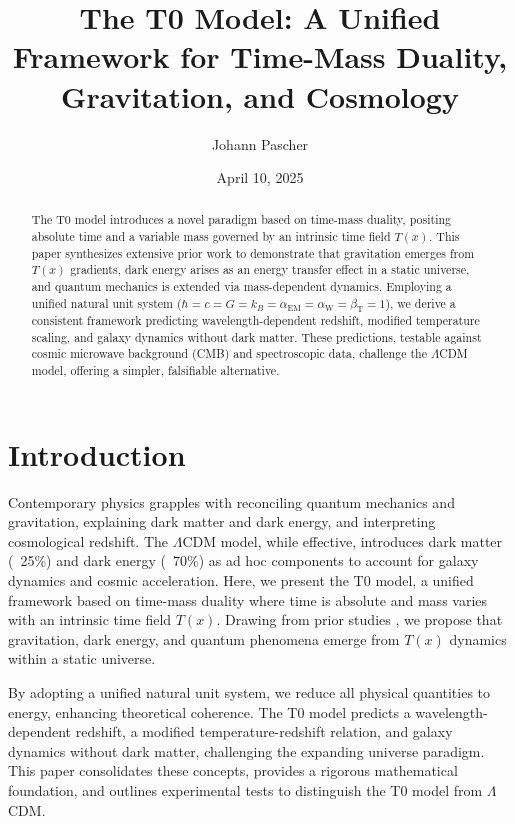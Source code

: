 \documentclass[12pt,a4paper]{article}
\title{The T0 Model: A Unified Framework for Time-Mass Duality, Gravitation, and Cosmology}
\author{Johann Pascher}
\date{April 10, 2025}
\newcommand{\Tfield}{T(x)}
\begin{document}
	
	\maketitle
	
	\begin{abstract}
		The T0 model introduces a novel paradigm based on time-mass duality, positing absolute time and a variable mass governed by an intrinsic time field \(\Tfield\). This paper synthesizes extensive prior work to demonstrate that gravitation emerges from \(\Tfield\) gradients, dark energy arises as an energy transfer effect in a static universe, and quantum mechanics is extended via mass-dependent dynamics. Employing a unified natural unit system (\(\hbar = c = G = k_B = \alpha_{\text{EM}} = \alpha_{\text{W}} = \beta_{\text{T}} = 1\)), we derive a consistent framework predicting wavelength-dependent redshift, modified temperature scaling, and galaxy dynamics without dark matter. These predictions, testable against cosmic microwave background (CMB) and spectroscopic data, challenge the \(\Lambda\)CDM model, offering a simpler, falsifiable alternative.
	\end{abstract}
	
	\tableofcontents
	\newpage
	
	\section{Introduction}
	
	Contemporary physics grapples with reconciling quantum mechanics and gravitation, explaining dark matter and dark energy, and interpreting cosmological redshift. The \(\Lambda\)CDM model, while effective, introduces dark matter (~25\%) and dark energy (~70\%) as ad hoc components to account for galaxy dynamics and cosmic acceleration. Here, we present the T0 model, a unified framework based on time-mass duality where time is absolute and mass varies with an intrinsic time field \(\Tfield\). Drawing from prior studies \cite{pascher_galaxies_2025, pascher_perspektive_2025, pascher_energiedynamik_2025, pascher_photons_2025, pascher_erweiterung_2025, pascher_alphabeta_2025, pascher_temp_2025, pascher_params_2025, pascher_zeit_2025, pascher_lagrange_2025, pascher_alpha_2025, pascher_higgs_2025}, we propose that gravitation, dark energy, and quantum phenomena emerge from \(\Tfield\) dynamics within a static universe.
	
	By adopting a unified natural unit system, we reduce all physical quantities to energy, enhancing theoretical coherence. The T0 model predicts a wavelength-dependent redshift, a modified temperature-redshift relation, and galaxy dynamics without dark matter, challenging the expanding universe paradigm. This paper consolidates these concepts, provides a rigorous mathematical foundation, and outlines experimental tests to distinguish the T0 model from \(\Lambda\)CDM.
	
\end{document}
